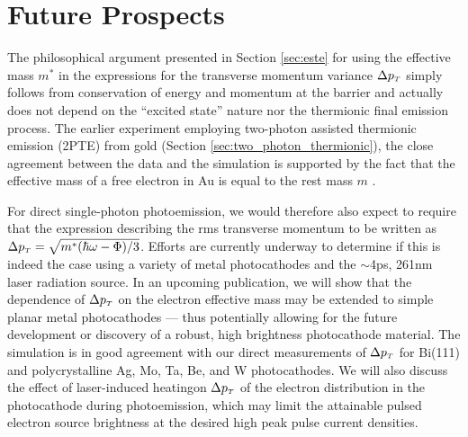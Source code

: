\section{Future Prospects} \label{sec:photocathode_future}

The philosophical argument presented in Section \ref{sec:este} for using the effective mass $m^*$ in the expressions for the transverse momentum variance $\Delta p_{{\scriptscriptstyle T}}$ simply follows from conservation of energy and momentum at the barrier and actually does not depend on the ``excited state'' nature nor the thermionic final emission process.
The earlier experiment employing two-photon assisted thermionic emission (2PTE) from gold (Section \ref{sec:two_photon_thermionic}), the close agreement between the data and the simulation is supported by the fact that the effective mass of a free electron in Au is equal to the rest mass $m$ \cite{johnson_optical_1972}.

For direct single-photon photoemission, we would therefore also expect to require that the expression describing the rms transverse momentum to be written as $\Delta p_{{\scriptscriptstyle T}} = \sqrt{m^* ( \hbar \omega - \Phi ) / 3 }$.
Efforts are currently underway to determine if this is indeed the case using a variety of metal photocathodes and the $\sim$4ps, 261nm laser radiation source.
In an upcoming publication, we will show that the dependence of $\Delta p_{{\scriptscriptstyle T}}$ on the electron effective mass may be extended to simple planar metal photocathodes --- thus potentially allowing for the future development or discovery of a robust, high brightness photocathode material.
The simulation is in good agreement with our direct measurements of $\Delta p_{{\scriptscriptstyle T}}$ for Bi(111) and polycrystalline Ag, Mo, Ta, Be, and W photocathodes.
We will also discuss the effect of laser-induced heatingon $\Delta p_{{\scriptscriptstyle T}}$ of the electron distribution in the photocathode during photoemission, which may limit the attainable pulsed electron source brightness at the desired high peak pulse current densities.
